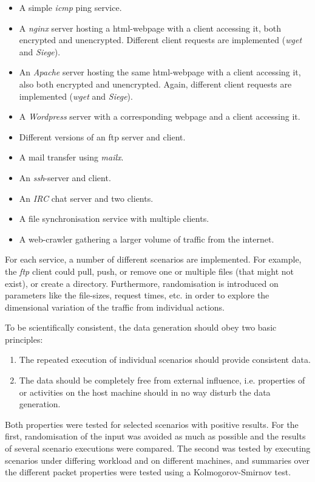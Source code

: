 \documentclass[a4paper,12pt,twoside]{report}
\begin{document}
\begin{itemize}
\item A simple \textit{icmp} ping service.
\item A \textit{nginx} server hosting a html-webpage with a client accessing it, both encrypted and unencrypted. Different client requests are implemented (\textit{wget} and \textit{Siege}).
\item An \textit{Apache} server hosting the same html-webpage with a client accessing it, also both encrypted and unencrypted. Again, different client requests are implemented (\textit{wget} and \textit{Siege}).
\item A \textit{Wordpress} server with a corresponding webpage and a client accessing it.
\item Different versions of an ftp server and client.
\item A mail transfer using \textit{mailx}.
\item An \textit{ssh}-server and client.
\item An \textit{IRC} chat server and two clients.
\item A file synchronisation service with multiple clients.
\item A web-crawler gathering a larger volume of traffic from the internet.
\end{itemize}

For each service, a number of different scenarios are implemented. For example, the \textit{ftp} client could pull, push, or remove one or multiple files (that might not exist), or create a directory. Furthermore, randomisation is introduced on parameters like the file-sizes, request times, etc. in order to explore the dimensional variation of the traffic from individual actions.

To be scientifically consistent, the data generation should obey two basic principles: 
\begin{enumerate}
\item The repeated execution of individual scenarios should provide consistent data.

\item The data should be completely free from external influence, i.e. properties of or activities on the host machine should in no way disturb the data generation.
\end{enumerate}

Both properties were tested for selected scenarios with positive results. For the first, randomisation of the input was avoided as much as possible and the results of several scenario executions were compared. The second was tested by executing scenarios under differing workload and on different machines, and summaries over the different packet properties were tested using a Kolmogorov-Smirnov test.  
\end{document}
